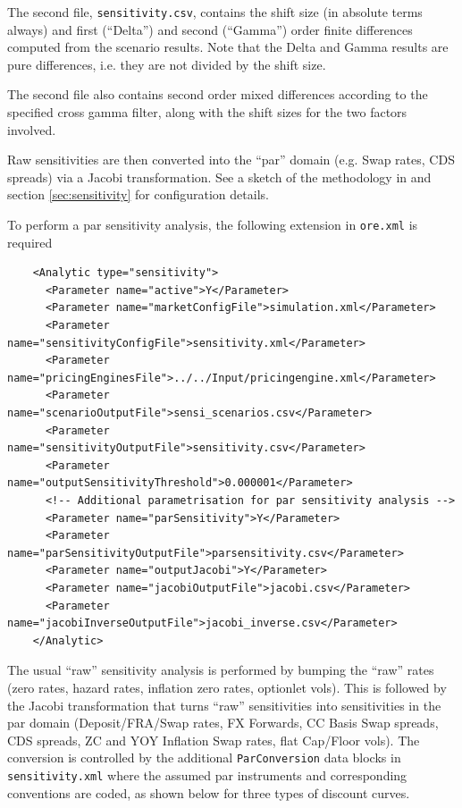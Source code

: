 The second file, {\tt sensitivity.csv}, contains the shift size (in absolute terms always) and first (``Delta'') and second
(``Gamma'') order finite differences computed from the scenario results. Note that the Delta and Gamma results are pure
differences, i.e. they are not divided by the shift size.

The second file also contains second order mixed differences according to the specified cross gamma filter, along with the shift sizes for the two factors involved.

\medskip
Raw sensitivities are then converted into the ``par'' domain (e.g. Swap rates, CDS spreads) via a Jacobi transformation. See a sketch of the
methodology in \cite{methods} and section \ref{sec:sensitivity} for configuration details.

To perform a par sensitivity analysis, the following extension in {\tt ore.xml} is required

\begin{verbatim}
    <Analytic type="sensitivity">
      <Parameter name="active">Y</Parameter>
      <Parameter name="marketConfigFile">simulation.xml</Parameter>
      <Parameter name="sensitivityConfigFile">sensitivity.xml</Parameter>
      <Parameter name="pricingEnginesFile">../../Input/pricingengine.xml</Parameter>
      <Parameter name="scenarioOutputFile">sensi_scenarios.csv</Parameter>
      <Parameter name="sensitivityOutputFile">sensitivity.csv</Parameter>
      <Parameter name="outputSensitivityThreshold">0.000001</Parameter>
      <!-- Additional parametrisation for par sensitivity analysis -->
      <Parameter name="parSensitivity">Y</Parameter>
      <Parameter name="parSensitivityOutputFile">parsensitivity.csv</Parameter>
      <Parameter name="outputJacobi">Y</Parameter>
      <Parameter name="jacobiOutputFile">jacobi.csv</Parameter>
      <Parameter name="jacobiInverseOutputFile">jacobi_inverse.csv</Parameter>
    </Analytic>
\end{verbatim}

The usual ``raw'' sensitivity analysis is performed by bumping the ``raw'' rates (zero rates, hazard rates, inflation zero rates, optionlet vols).
This is followed by the Jacobi transformation that turns ``raw'' sensitivities  into sensitivities in the par domain (Deposit/FRA/Swap rates, FX Forwards, CC Basis Swap spreads,
CDS spreads, ZC and YOY Inflation Swap rates, flat Cap/Floor vols). The conversion is controlled by the additional {\tt ParConversion} data blocks
in {\tt sensitivity.xml} where the assumed par instruments and corresponding conventions are coded, as shown below for three types of discount curves.

